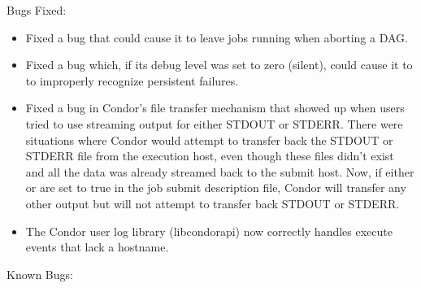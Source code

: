 \noindent Bugs Fixed:

\begin{itemize}

\item Fixed a  bug that could cause it to leave jobs running
when aborting a DAG.

\item Fixed a  bug which, if its debug level was set to
zero (silent), could cause it to to improperly recognize persistent
 failures.

\item Fixed a bug in Condor's file transfer mechanism that showed up
  when users tried to use streaming output for either STDOUT or
  STDERR.
  There were situations where Condor would attempt to transfer back
  the STDOUT or STDERR file from the execution host, even though these
  files didn't exist and all the data was already streamed back to the
  submit host.
  Now, if either  or  are set
  to true in the job submit description file, Condor will transfer any
  other output but will not attempt to transfer back STDOUT or STDERR.

\item The Condor user log library (libcondorapi) now correctly handles
  execute events that lack a hostname.

\end{itemize}

\noindent Known Bugs:

